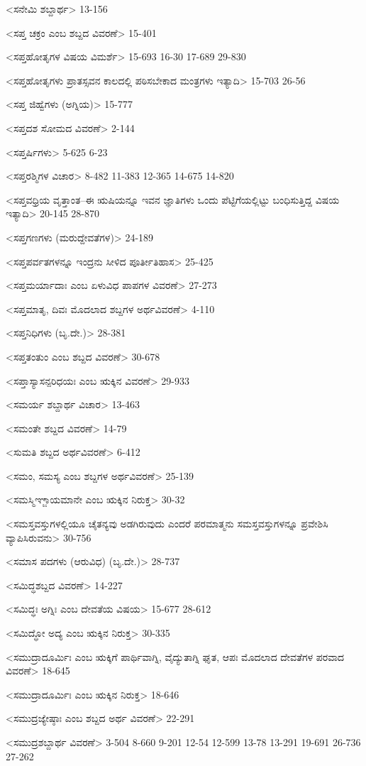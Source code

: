 <ಸನೇಮಿ ಶಬ್ದಾರ್ಥ>
13-156

<ಸಪ್ತ ಚಕ್ರಂ ಎಂಬ ಶಬ್ದದ ವಿವರಣೆ>
15-401

<ಸಪ್ತಹೋತೃಗಳ ವಿಷಯ ವಿಮರ್ಶೆ>
15-693 
16-30
17-689
29-830

<ಸಪ್ತಹೋತೃಗಳು ಪ್ರಾತಸ್ಸವನ ಕಾಲದಲ್ಲಿ ಪಠಿಸಬೇಕಾದ ಮಂತ್ರಗಳು ಇತ್ಯಾದಿ>
15-703
26-56

<ಸಪ್ತ ಜಿಹ್ವೆಗಳು (ಅಗ್ನಿಯ)>
15-777

<ಸಪ್ತದಶ ಸೋಮದ ವಿವರಣೆ>
2-144

<ಸಪ್ತರ್ಷಿಗಳು>
5-625
6-23

<ಸಪ್ತರಶ್ಮಿಗಳ ವಿಚಾರ>
8-482 
11-383
12-365
14-675
14-820

<ಸಪ್ತವಧ್ರಿಯ ವೃತ್ತಾಂತ–ಈ ಋಷಿಯನ್ನೂ ಇವನ ಜ್ಞಾತಿಗಳು ಒಂದು ಪೆಟ್ಟಿಗೆಯಲ್ಲಿಟ್ಟು ಬಂಧಿಸುತ್ತಿದ್ದ ವಿಷಯ ಇತ್ಯಾದಿ>
20-145
28-870

<ಸಪ್ತಗಣಗಳು (ಮರುದ್ದೇವತೆಗಳ)>
24-189

<ಸಪ್ತಪರ್ವತಗಳನ್ನೂ ಇಂದ್ರನು ಸೀಳಿದ ಪೂರ್ತೀತಿಹಾಸ>
25-425

<ಸಪ್ತಮರ್ಯಾದಾಃ ಎಂಬ ಏಳುವಿಧ ಪಾಪಗಳ ವಿವರಣೆ>
27-273

<ಸಪ್ತಮಾತೃ, ದಿವಃ ಮೊದಲಾದ ಶಬ್ದಗಳ ಅರ್ಥವಿವರಣೆ>
4-110

<ಸಪ್ತನಿಧಿಗಳು (ಬೃ.ದೇ.)>
28-381

<ಸಪ್ತತಂತುಂ ಎಂಬ ಶಬ್ದದ ವಿವರಣೆ>
30-678

<ಸಪ್ತಾಸ್ಯಾಸನ್ಪರಿಧಯಃ ಎಂಬ ಋಕ್ಕಿನ ವಿವರಣೆ>
29-933

<ಸಮರ್ಯ ಶಬ್ದಾರ್ಥ ವಿಚಾರ>
13-463

<ಸಮಂತೇ ಶಬ್ದದ ವಿವರಣೆ>
14-79

<ಸುಮತಿ ಶಬ್ದದ ಅರ್ಥವಿವರಣೆ>
6-412

<ಸಮಂ, ಸಮಸ್ಯ ಎಂಬ ಶಬ್ದಗಳ ಅರ್ಥವಿವರಣೆ>
25-139

<ಸಮಸ್ಮಿಞ್ಜಾಯಮಾನೇ ಎಂಬ ಋಕ್ಕಿನ ನಿರುಕ್ತ>
30-32

<ಸಮಸ್ತವಸ್ತುಗಳಲ್ಲಿಯೂ ಚೈತನ್ಯವು ಅಡಗಿರುವುದು ಎಂದರೆ ಪರಮಾತ್ಮನು ಸಮಸ್ತವಸ್ತುಗಳನ್ನೂ ಪ್ರವೇಶಿಸಿ ವ್ಯಾಪಿಸಿರುವನು>
30-756

<ಸಮಾಸ ಪದಗಳು (ಆರುವಿಧ) (ಬೃ.ದೇ.)>
28-737

<ಸಮಿದ್ಧಶಬ್ದದ ವಿವರಣೆ>
14-227

<ಸಮಿದ್ಧಃ ಅಗ್ನಿಃ ಎಂಬ ದೇವತೆಯ ವಿಷಯ>
15-677
28-612

<ಸಮಿದ್ಧೋ ಅದ್ಯ ಎಂಬ ಋಕ್ಕಿನ ನಿರುಕ್ತ>
30-335

<ಸಮುದ್ರಾದೂರ್ಮಿಃ ಎಂಬ ಋಕ್ಕಿಗೆ ಪಾರ್ಥಿವಾಗ್ನಿ, ವೈದ್ಯುತಾಗ್ನಿ ಘೃತ, ಆಪಃ ಮೊದಲಾದ ದೇವತೆಗಳ ಪರವಾದ ವಿವರಣೆ>
18-645

<ಸಮುದ್ರಾದೂರ್ಮಿಃ ಎಂಬ ಋಕ್ಕಿನ ನಿರುಕ್ತ>
18-646

<ಸಮುದ್ರಜ್ಯೇಷ್ಠಾಃ ಎಂಬ ಶಬ್ದದ ಅರ್ಥ ವಿವರಣೆ>
22-291

<ಸಮುದ್ರಶಬ್ದಾರ್ಥ ವಿವರಣೆ>
3-504 
8-660
9-201 
12-54
12-599
13-78
13-291
19-691 
26-736
27-262


